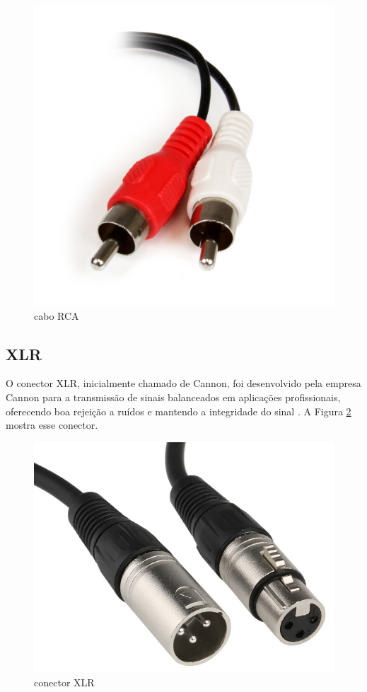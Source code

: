 \begin{figure}[h]
	\centering
    \includegraphics[scale=0.1]{figuras/fig22.png}
	\caption{cabo RCA \cite{rs}}
	\label{fig22}
\end{figure}

\subsection{XLR}

O conector XLR, inicialmente chamado de Cannon, foi desenvolvido pela empresa Cannon para a transmissão de sinais balanceados em aplicações profissionais, oferecendo boa rejeição a ruídos e mantendo a integridade do sinal \cite{bartlett}. A Figura \ref{fig23} mostra esse conector.

\begin{figure}[h]
	\centering
    \includegraphics[scale=0.2]{figuras/fig23.png}
	\caption{conector XLR \cite{hollylandWhatCable}}
	\label{fig23}
\end{figure}


